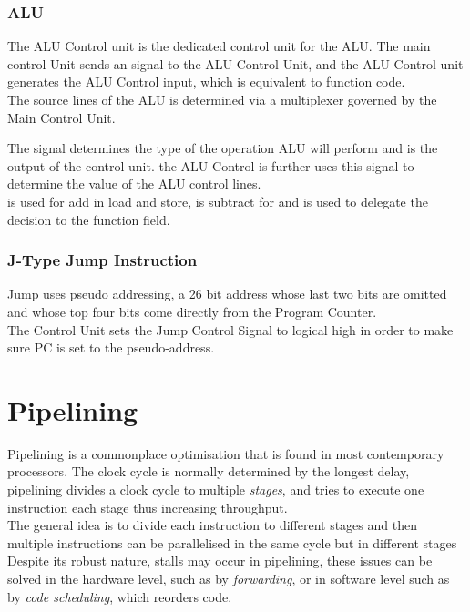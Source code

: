 \documentclass[11pt,a4paper,twocolumn]{book}
\begin{document}
\subsection{ALU}

The ALU Control unit is the dedicated control unit for the ALU. The main control Unit sends an  signal to the ALU Control Unit, and the ALU Control unit generates the ALU Control input, which is equivalent to function code.\\

The source lines of the ALU is determined via a multiplexer governed by the Main Control Unit.

The  signal determines the type of the operation ALU will perform and is the output of the control unit. the ALU Control is further uses this signal to determine the value of the ALU control lines.\\

 is used for add in load and store,  is subtract for  and  is used to delegate the decision to the function field.\\

\subsection{J-Type Jump Instruction}

Jump uses pseudo addressing, a 26 bit address whose last two bits are omitted and whose top four bits come directly from the Program Counter.\\

The Control Unit sets the Jump Control Signal to logical high in order to make sure PC is set to the pseudo-address.

\chapter{Pipelining}

Pipelining is a commonplace optimisation that is found in most contemporary processors. The clock cycle is normally determined by the longest delay, pipelining divides a clock cycle to multiple \textit{stages}, and tries to execute one instruction each stage thus increasing throughput.\\

The general idea is to divide each instruction to different stages and then multiple instructions can be parallelised in the same cycle but in different stages\\

Despite its robust nature, stalls may occur in pipelining, these issues can be solved in the hardware level, such as by \textit{forwarding}, or in software level such as by \textit{code scheduling}, which reorders code.
\end{document}
